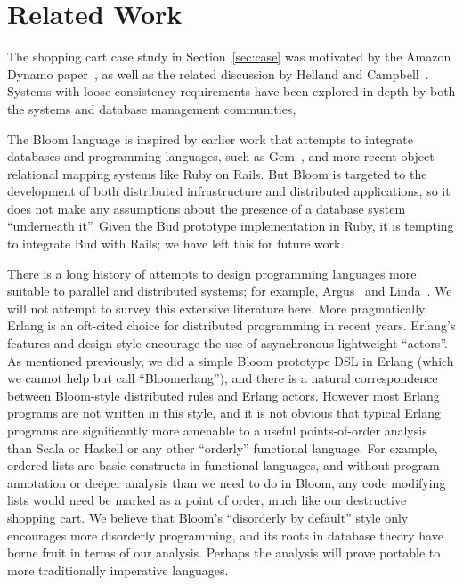 \section{Related Work}
\label{sec:relwork}
The shopping cart case study in Section~\ref{sec:case} was motivated by the
Amazon Dynamo paper~\cite{dynamo}, as well as the related discussion by Helland
and Campbell~\cite{quicksand}. Systems with loose consistency requirements have
been explored in depth by both the systems and database management communities,

The Bloom language is inspired by earlier work that attempts to integrate
databases and programming languages, such as Gem~\cite{gem}, and more recent
object-relational mapping systems like Ruby on Rails.  But Bloom is targeted to the development of both distributed infrastructure and distributed applications, so it does not make any assumptions about the presence of a database system ``underneath it''.  Given the Bud prototype implementation in Ruby, it is tempting to integrate Bud with Rails; we have left this for future work.

There is a long history of attempts to design programming languages more
suitable to parallel and distributed systems; for example, Argus~\cite{argus}
and Linda~\cite{linda}.  We will not attempt to survey this extensive literature here.  More pragmatically, Erlang is an oft-cited choice for distributed programming in recent years.  Erlang's features and design style encourage the use of asynchronous lightweight ``actors''.  As mentioned previously, we did a simple Bloom prototype DSL in Erlang (which we cannot help but call ``Bloomerlang''), and there is a natural correspondence between Bloom-style distributed rules and Erlang actors.  However most Erlang programs are not written in this style, and it is not obvious that typical Erlang programs are significantly more amenable to a useful points-of-order analysis than Scala or Haskell or any other ``orderly'' functional language.  For example, ordered lists are basic constructs in functional languages, and without program annotation or deeper analysis than we need to do in Bloom, any code modifying lists would need be marked as a point of order, much like our destructive shopping cart.  We believe that Bloom's ``disorderly by default'' style only encourages more disorderly programming, and its roots in database theory have borne fruit in terms of our analysis.  Perhaps the analysis will prove portable to more traditionally imperative languages.

